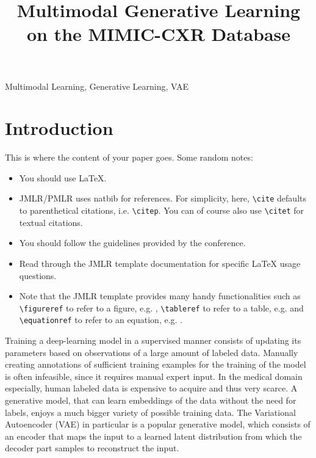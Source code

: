 \documentclass{midl} %
\title[Multimodal Generative Learning on the MIMIC-CXR Database]{Multimodal Generative Learning on the MIMIC-CXR Database}
\begin{document}
\maketitle



\begin{keywords}
Multimodal Learning, Generative Learning, VAE
\end{keywords}

\section{Introduction}

This is where the content of your paper goes.  Some random notes:
\begin{itemize}
\item You should use \LaTeX \cite{Lamport:Book:1989}.
\item JMLR/PMLR uses natbib for references. For simplicity, here, \verb|\cite|  defaults to
  parenthetical citations, i.e. \verb|\citep|. You can of course also
  use \verb|\citet| for textual citations.
\item You should follow the guidelines provided by the conference.
\item Read through the JMLR template documentation for specific \LaTeX
  usage questions.
\item Note that the JMLR template provides many handy functionalities
such as \verb|\figureref| to refer to a figure,
e.g. ,  \verb|\tableref| to refer to a table,
e.g.  and \verb|\equationref| to refer to an equation,
e.g. .
\end{itemize}

    Training a deep-learning model in a supervised manner consists of updating its parameters based on observations of a large amount of labeled data.
	Manually creating annotations of sufficient training examples for the training of the model is often infeasible, since it requires manual expert input.
	In the medical domain especially, human labeled data is expensive to acquire and thus very scarce.
	A generative model, that can learn embeddings of the data without the need for labels, enjoys a much bigger variety of possible training data.
	The Variational Autoencoder (VAE) \cite{doersch2016tutorial} in particular is a popular generative model, which consists of an encoder that maps the input to a learned latent distribution from which the decoder part samples to reconstruct the input.
\end{document}
